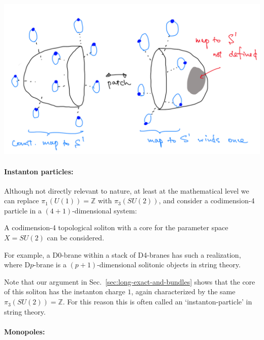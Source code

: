 \documentclass[12pt]{article}
\numberwithin{equation}{section}
\theoremstyle{remark}
\renewenvironment{figure}[1][]{
  \begin{originalfigure}[#1]
    \begin{mdframed}[linecolor=black!0,backgroundcolor=black!1]
}{
    \end{mdframed}
  \end{originalfigure}
}
\def\bZ{\mathbb{Z}}
\begin{document}
\begin{figure}[h]
\centering
\includegraphics[width=.8\textwidth]{vortex-flux.png}
\caption{To measure the magnetic flux, we can put a vortex configuration on $S^2$.
This requires a nontrivial gauge transformation around the equator.}
\label{fig:vortex-flux}
\end{figure}


\paragraph{Instanton particles:}

Although not directly relevant to nature,
at least at the mathematical level we can replace $\pi_1(U(1))=\bZ$ with $\pi_3(SU(2))$,
and consider a codimension-4 particle in a $(4+1)$-dimensional system:
\begin{example}
A codimension-4 topological soliton with a core for the parameter space $X=SU(2)$
can be considered.
\end{example}
For example, a D0-brane within a stack of D4-branes has such a realization,
where D$p$-brane is a $(p+1)$-dimensional solitonic objects in string theory.

Note that our argument in Sec.~\ref{sec:long-exact-and-bundles} 
shows that the core of this soliton has the instanton charge $1$, 
again characterized by the same $\pi_3(SU(2))=\bZ$.
For this reason this is often called an `instanton-particle' in string theory.

\paragraph{Monopoles:}
\end{document}
